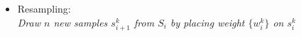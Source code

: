 \begin{itemize}


\item Resampling:\\
	\emph{
	Draw \(n\) new samples \(s^k_{i+1}\) from \(S_i\) by placing
	weight \(\{w^k_i\}\) on \(s^k_{i}\)
	}
\end{itemize}
